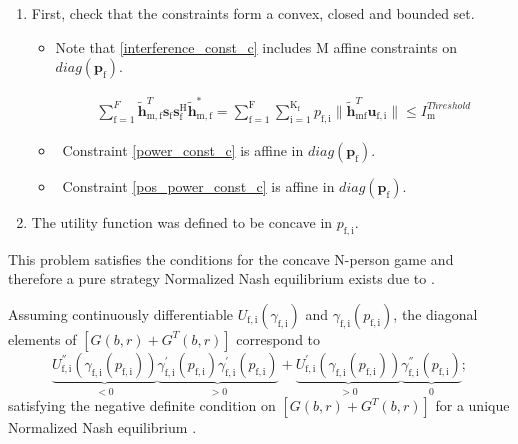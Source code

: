 \documentclass[12pt,a4paper]{report}
\begin{document}
\begin{enumerate}


\item
First, check that the constraints form a convex, closed and bounded set. 

\begin{itemize}

\item
	Note that \eqref{interference_const_c} includes $\text{M}$ affine constraints on $diag(\mathbf{p_{\mathrm{f}}})$.

\begin{gather*}
	  \sum^F_{\text{f}=1} \mathbf{\tilde{h}}_{\mathrm{m,f}}^T  \mathbf{s}_{\mathrm{f}} 						
	\mathbf{s_{\mathrm{f}}^{\mathrm{H}}} \mathbf{\tilde{h}_{\mathrm{m,f}}^*} 
	=
	\sum_{\mathrm{f=1}}^{\mathrm{F}}	\sum_{\mathrm{i=1}}^{\mathrm{K_f}}
	p_{\mathrm{f,i}}\|\tilde{\mathbf{h}}_{\mathrm{mf}}^T \mathbf{u}_{\mathrm{f,i}}\|
	\leq I^{Threshold}_{\mathrm{m}} 
\end{gather*}

\item \
	Constraint \eqref{power_const_c} is  affine in $diag(\mathbf{p_{\mathrm{f}}})$.
	
\item \
	Constraint \eqref{pos_power_const_c} is affine in $diag(\mathbf{p_{\mathrm{f}}})$.
\end{itemize}


\item The utility function was defined to be concave in $p_{\mathrm{f,i}}$. 

\end{enumerate}

This problem satisfies the conditions for the concave N-person game and therefore a pure strategy Normalized Nash equilibrium exists due to 
\cite[Thm1]{rosen1964existence}.

Assuming continuously differentiable $U_{\mathrm{f,i}}(\gamma_{\mathrm{f,i}})$ and $\gamma_{\mathrm{f,i}}(p_{\mathrm{f,i}})$, the diagonal elements of $[G(b,r)+G^{T}(b,r)] $ correspond to
\begin{equation}
\underbrace{U^{''}_{\mathrm{f,i}}(\gamma_{\mathrm{f,i}}(p_{\mathrm{f,i}}))}_{<0}\underbrace{\gamma^{'}_{\mathrm{f,i}}(p_{\mathrm{f,i}})\gamma^{'}_{\mathrm{f,i}}(p_{\mathrm{f,i}})}_{>0}
+
\underbrace{U^{'}_{\mathrm{f,i}}(\gamma_{\mathrm{f,i}}(p_{\mathrm{f,i}}))}_{>0}\underbrace{\gamma^{''}_{\mathrm{f,i}}(p_{\mathrm{f,i}})}_{0};
\end{equation}
satisfying the  negative definite condition on $[G(b,r)+G^{T}(b,r)] $ for a unique Normalized Nash equilibrium \cite[Thm4]{rosen1964existence}.
\end{document}
